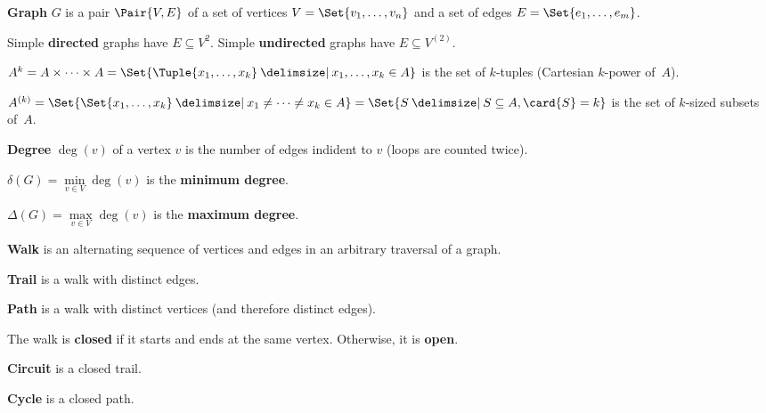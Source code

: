 \documentclass[a4paper,12pt]{article}
\newcommand{\op}[1]{\operatorname*{#1}}
\newcommand{\degree}[1]{\op{deg}(#1)}
\newcommand{\minDegree}[1]{\delta(#1)}
\newcommand{\maxDegree}[1]{\Delta(#1)}
\begin{document}
\begin{terms}
    \item \textbf{Graph} $G$ is a pair $\Pair{V, E}$ of a set of vertices $V = \Set{v_1,\dotsc,v_n}$ and a set of edges $E = \Set{e_1,\dotsc,e_m}$.

    \item Simple \textbf{directed} graphs have $E \subseteq V^{2}$. Simple \textbf{undirected} graphs have $E \subseteq V^{(2)}$.
    \begin{terms}
        \item $A^k = A \times \dotsb \times A = \Set{\Tuple{x_1,\dotsc,x_k} \given x_1,\dotsc,x_k \in A}$ is the set of $k$-tuples (Cartesian $k$-power of~$A$).

        \item $A^{(k)} = \Set{\Set{x_1,\dotsc,x_k} \given x_1 \neq \dotsb \neq x_k \in A} = \Set{ S \given S \subseteq A, \card{S} = k }$ is the set of $k$-sized subsets of~$A$.
    \end{terms}

    \item \textbf{Degree} $\degree{v}$ of a vertex $v$ is the number of edges indident to $v$ (loops are counted twice).
    \begin{terms}
        \item $\minDegree{G} = \min\limits_{v \in V} \degree{v}$ is the \textbf{minimum degree}.
        \item $\maxDegree{G} = \max\limits_{v \in V} \degree{v}$ is the \textbf{maximum degree}.
    \end{terms}


    \item \textbf{Walk} is an alternating sequence of vertices and edges in an arbitrary traversal of a graph.
    \begin{terms}
        \item \textbf{Trail} is a walk with distinct edges.
        \item \textbf{Path} is a walk with distinct vertices (and therefore distinct edges).
        \item The walk is \textbf{closed} if it starts and ends at the same vertex. Otherwise, it is \textbf{open}.
        \item \textbf{Circuit} is a closed trail.
        \item \textbf{Cycle} is a closed path.
    \end{terms}


\end{terms}
\end{document}
